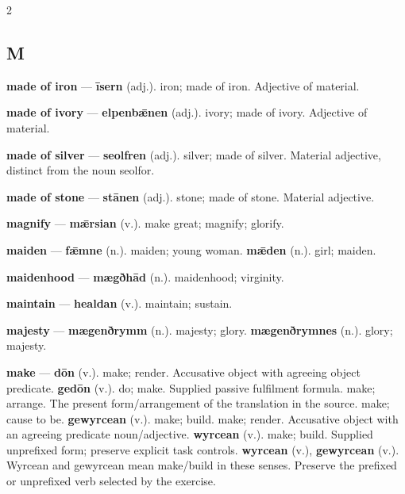 \begin{multicols}{2}
\subsection*{M}
\textbf{made of iron} — \textbf{īsern} (adj.). iron; made of iron. Adjective of material.\par
\textbf{made of ivory} — \textbf{elpenbǣnen} (adj.). ivory; made of ivory. Adjective of material.\par
\textbf{made of silver} — \textbf{seolfren} (adj.). silver; made of silver. Material adjective, distinct from the noun seolfor.\par
\textbf{made of stone} — \textbf{stānen} (adj.). stone; made of stone. Material adjective.\par
\textbf{magnify} — \textbf{mǣrsian} (v.). make great; magnify; glorify.\par
\textbf{maiden} — \textbf{fǣmne} (n.). maiden; young woman. \textbf{mǣden} (n.). girl; maiden.\par
\textbf{maidenhood} — \textbf{mægðhād} (n.). maidenhood; virginity.\par
\textbf{maintain} — \textbf{healdan} (v.). maintain; sustain.\par
\textbf{majesty} — \textbf{mægenðrymm} (n.). majesty; glory. \textbf{mægenðrymnes} (n.). glory; majesty.\par
\textbf{make} — \textbf{dōn} (v.). make; render. Accusative object with agreeing object predicate. \textbf{gedōn} (v.). do; make. Supplied passive fulfilment formula. make; arrange. The present form/arrangement of the translation in the source. make; cause to be. \textbf{gewyrcean} (v.). make; build. make; render. Accusative object with an agreeing predicate noun/adjective. \textbf{wyrcean} (v.). make; build. Supplied unprefixed form; preserve explicit task controls. \textbf{wyrcean} (v.), \textbf{gewyrcean} (v.). Wyrcean and gewyrcean mean make/build in these senses. Preserve the prefixed or unprefixed verb selected by the exercise.\par

\end{multicols}
